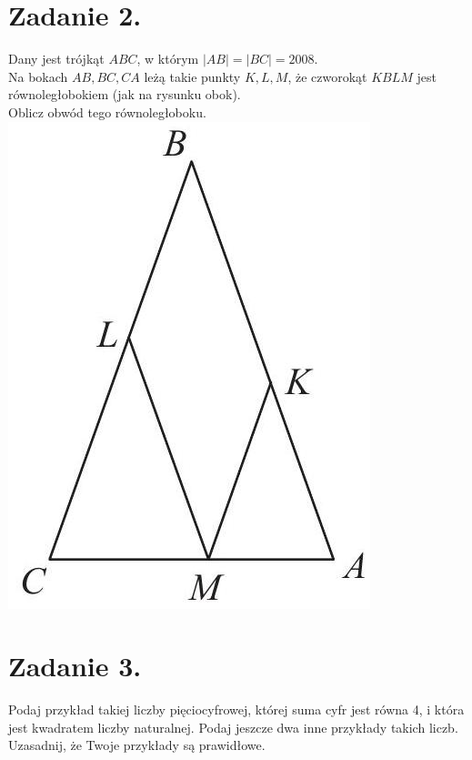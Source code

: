 \documentclass[10pt]{article}
\begin{document}
\section*{Zadanie 2.}
Dany jest trójkąt \(A B C\), w którym \(|A B|=|B C|=2008\).\\
Na bokach \(A B, B C, C A\) leżą takie punkty \(K, L, M\), że czworokąt \(K B L M\) jest równoległobokiem (jak na rysunku obok).\\
Oblicz obwód tego równoległoboku.\\
\includegraphics[max width=\textwidth, center]{2024_11_21_a60e976091171712aedfg-1(2)}

\section*{Zadanie 3.}
Podaj przykład takiej liczby pięciocyfrowej, której suma cyfr jest równa 4, i która jest kwadratem liczby naturalnej. Podaj jeszcze dwa inne przykłady takich liczb.\\
Uzasadnij, że Twoje przykłady są prawidłowe.
\end{document}
